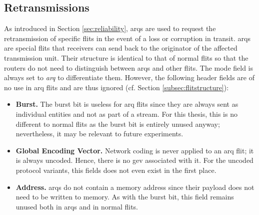 \subsection{Retransmissions}\label{subsec:arqretransmissions}
As introduced in Section \ref{sec:reliability}, \glspl{arq} are used to request the retransmission of specific flits in the event of a loss or
corruption in transit. \Glspl{arq} are special flits that receivers can send back to the originator of the affected transmission unit. Their structure
is identical to that of normal flits so that the routers do not need to distinguish between \glspl{arq} and other flits. The mode field is always set
to \textit{\gls{arq}} to differentiate them. However, the following header fields are of no use in \gls{arq} flits and are thus ignored (cf. Section
\ref{subsec:flitstructure}):
\begin{itemize}
    \item \textbf{Burst.} The burst bit is useless for \gls{arq} flits since they are always sent as individual entities and not as part of a stream.
        For this thesis, this is no different to normal flits as the burst bit is entirely unused anyway; nevertheless, it may be relevant to future
        experiments.
    \item \textbf{Global Encoding Vector.} Network coding is never applied to an \gls{arq} flit; it is always uncoded. Hence, there is no \gls{gev}
        associated with it. For the uncoded protocol variants, this fields does not even exist in the first place.
    \item \textbf{Address.} \Glspl{arq} do not contain a memory address since their payload does not need to be written to memory. As with the burst
        bit, this field remains unused both in \glspl{arq} and in normal flits.
\end{itemize}
\vspace{0.5\baselineskip}

